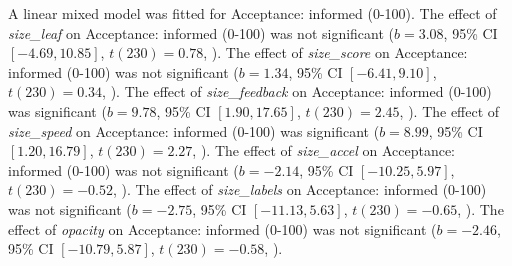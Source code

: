 A linear mixed model was fitted for Acceptance: informed (0-100).
The effect of \textit{size\_leaf} on Acceptance: informed (0-100) was not significant ($b = 3.08$, 95\% CI $[-4.69, 10.85]$, $t(230) = 0.78$, ).
The effect of \textit{size\_score} on Acceptance: informed (0-100) was not significant ($b = 1.34$, 95\% CI $[-6.41, 9.10]$, $t(230) = 0.34$, ).
The effect of \textit{size\_feedback} on Acceptance: informed (0-100) was significant ($b = 9.78$, 95\% CI $[1.90, 17.65]$, $t(230) = 2.45$, ).
The effect of \textit{size\_speed} on Acceptance: informed (0-100) was significant ($b = 8.99$, 95\% CI $[1.20, 16.79]$, $t(230) = 2.27$, ).
The effect of \textit{size\_accel} on Acceptance: informed (0-100) was not significant ($b = -2.14$, 95\% CI $[-10.25, 5.97]$, $t(230) = -0.52$, ).
The effect of \textit{size\_labels} on Acceptance: informed (0-100) was not significant ($b = -2.75$, 95\% CI $[-11.13, 5.63]$, $t(230) = -0.65$, ).
The effect of \textit{opacity} on Acceptance: informed (0-100) was not significant ($b = -2.46$, 95\% CI $[-10.79, 5.87]$, $t(230) = -0.58$, ).
